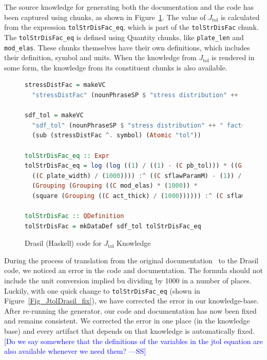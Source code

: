 \documentclass[sigconf]{acmart}
\newcommand{\authornt}[3]{\textcolor{#1}{[#3 ---#2]}}
\newcommand{\authornt}[3]{}
\newcommand{\wss}[1]{\authornt{blue}{SS}{#1}} %
\newcommand{\jtol}{$J_{\mbox{tol}}$}
\newcommand{\inlHask}[1]{\lstinline[language=Haskell, frame=single, showstringspaces=false]{#1}}
\begin{document}
The source knowledge for generating both the documentation and the code has been
captured using chunks, as shown in Figure~\ref{Fig_JtolDrasil}. The value of
\jtol{} is calculated from the expression {\inlHask{tolStrDisFac_eq}}, which is
part of the {\inlHask{tolStrDisFac}} chunk.  The {\inlHask{tolStrDisFac_eq}} is
defined using Quantity chunks, like {\inlHask{plate_len}} and {\inlHask{mod_elas}}.
These chunks themselves have their own definitions, which includes their
definition, symbol and units.  When the knowledge from \jtol{} is rendered in
some form, the knowledge from its constituent chunks is also available.

\begin{figure}
\begin{lstlisting}[language=Haskell, frame=single, showstringspaces=false] 
stressDistFac = makeVC 
  "stressDistFac" (nounPhraseSP $ "stress distribution" ++ " factor (Function)") cJ

sdf_tol = makeVC 
  "sdf_tol" (nounPhraseSP $ "stress distribution" ++ " factor (Function) based on Pbtol") 
  (sub (stressDistFac ^. symbol) (Atomic "tol"))

tolStrDisFac_eq :: Expr
tolStrDisFac_eq = log (log ((1) / ((1) - (C pb_tol))) * ((Grouping (((C plate_len) / (1000)) * 
  ((C plate_width) / (1000)))) :^ ((C sflawParamM) - (1)) / ((C sflawParamK) * 
  (Grouping (Grouping ((C mod_elas) * (1000)) * 
  (square (Grouping ((C act_thick) / (1000)))))) :^ (C sflawParamM) * (C loadDF))))

tolStrDisFac :: QDefinition
tolStrDisFac = mkDataDef sdf_tol tolStrDisFac_eq
\end{lstlisting}
\caption{Drasil (Haskell) code for \jtol{} Knowledge}
\label{Fig_JtolDrasil}
\end{figure}

During the process of translation from the original
documentation~\cite{SmithJegatheesanAndKelly2016} to the Drasil code, we noticed
an error in the code and documentation. The formula should not include the unit
conversion implied bu dividing by 1000 in a number of places. Luckily, with one
quick change to {\inlHask{tolStrDisFac_eq}} (shown in
Figure~\ref{Fig_JtolDrasil_fix}), we have corrected the error in our
knowledge-base. After re-running the generator, our code and documentation
has now been fixed and remains consistent.  We corrected the error in one place
(in the knowledge base) and every artifact that depends on that knowledge is
automatically fixed. \wss{Do we say somewhere that the definitions of the
  variables in the jtol equation are also available whenever we need them?}
\end{document}
